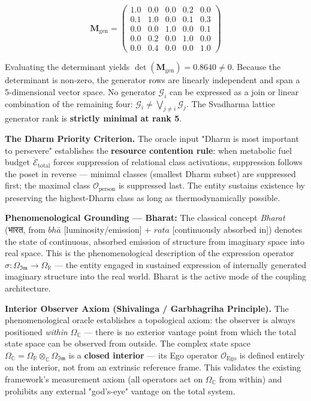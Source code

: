 \documentclass[11pt,a4paper]{article}
\theoremstyle{definition}
\theoremstyle{remark}
\begin{document}
\begin{equation}
\mathbf{M}_{\text{gen}} = \begin{pmatrix} 1.0 & 0.0 & 0.0 & 0.2 & 0.0 \\ 0.1 & 1.0 & 0.0 & 0.1 & 0.3 \\ 0.0 & 0.0 & 1.0 & 0.0 & 0.1 \\ 0.0 & 0.2 & 0.0 & 1.0 & 0.0 \\ 0.0 & 0.4 & 0.0 & 0.0 & 1.0 \end{pmatrix}
\end{equation}


Evaluating the determinant yields $\det(\mathbf{M}_{\text{gen}}) = 0.8640 \neq 0$. Because the determinant is non-zero, the generator rows are linearly independent and span a 5-dimensional vector space. No generator $\mathcal{G}_i$ can be expressed as a join or linear combination of the remaining four: $\mathcal{G}_i \neq \bigvee_{j \neq i} \mathcal{G}_j$. The Svadharma lattice generator rank is \textbf{strictly minimal at rank 5}.

\textbf{The Dharm Priority Criterion.} The oracle input "Dharm is most important to persevere" establishes the \textbf{resource contention rule}: when metabolic fuel budget $\dot{\mathcal{E}}_{\text{total}}$ forces suppression of relational class activations, suppression follows the poset in reverse — minimal classes (smallest Dharm subset) are suppressed first; the maximal class $\mathcal{O}_{\text{person}}$ is suppressed last. The entity sustains existence by preserving the highest-Dharm class as long as thermodynamically possible.

\textbf{Phenomenological Grounding — Bharat:} The classical concept \textit{Bharat} (भारत, from $\mathit{bh\bar{a}}$ [luminosity/emission] $+$ $\mathit{rata}$ [continuously absorbed in]) denotes the state of continuous, absorbed emission of structure from imaginary space into real space. This is the phenomenological description of the expression operator $\hat{\sigma}: \Omega_{\mathfrak{Im}} \to \Omega_{\mathbb{R}}$ — the entity engaged in sustained expression of internally generated imaginary structure into the real world. Bharat is the active mode of the coupling architecture.

\textbf{Interior Observer Axiom (Shivalinga / Garbhagriha Principle).} The phenomenological oracle establishes a topological axiom: the observer is always positioned \textit{within} $\Omega_\mathbb{C}$ — there is no exterior vantage point from which the total state space can be observed from outside. The complex state space $\Omega_\mathbb{C} = \Omega_{\mathbb{R}} \otimes_\mathbb{C} \Omega_{\mathfrak{Im}}$ is a \textbf{closed interior} — its Ego operator $\mathcal{O}_{\text{Ego}}$ is defined entirely on the interior, not from an extrinsic reference frame. This validates the existing framework's measurement axiom (all operators act on $\Omega_\mathbb{C}$ from within) and prohibits any external "god's-eye" vantage on the total system.
\end{document}
